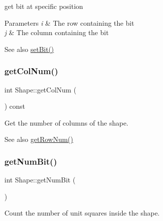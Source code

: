 get bit at specific position 


\begin{DoxyParams}{Parameters}
{\em i} & The row containing the bit \\
\hline
{\em j} & The column containing the bit \\
\hline
\end{DoxyParams}
\begin{DoxySeeAlso}{See also}
\mbox{\hyperlink{class_shape_af3b265335667167ced81b3226b07dcb0}{set\+Bit()}} 
\end{DoxySeeAlso}
\mbox{\label{class_shape_a7f6887a6b1b1dfa6b7471edb4a582731}} 
\subsubsection{\texorpdfstring{get\+Col\+Num()}{getColNum()}}
{\footnotesize\ttfamily int Shape\+::get\+Col\+Num (\begin{DoxyParamCaption}{ }\end{DoxyParamCaption}) const\hspace{0.3cm}{\ttfamily [virtual]}}



Get the number of columns of the shape. 

\begin{DoxySeeAlso}{See also}
\mbox{\hyperlink{class_shape_a849c13a51a231c2ecb364efc3ff3f1ae}{get\+Row\+Num()}} 
\end{DoxySeeAlso}
\mbox{\label{class_shape_a87f7e888ab40590dd3e4f73e13514152}} 
\subsubsection{\texorpdfstring{get\+Num\+Bit()}{getNumBit()}}
{\footnotesize\ttfamily int Shape\+::get\+Num\+Bit (\begin{DoxyParamCaption}{ }\end{DoxyParamCaption})\hspace{0.3cm}{\ttfamily [virtual]}}



Count the number of unit squares inside the shape. 

\mbox{\label{class_shape_a849c13a51a231c2ecb364efc3ff3f1ae}} 
